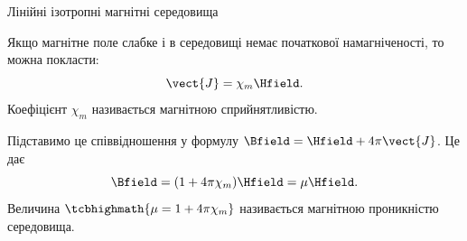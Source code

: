 \documentclass[onlytextwidth]{beamer}
\begin{document}
\begin{frame}{Лінійні ізотропні магнітні середовища}{}
	\begin{block}{}
		Якщо магнітне поле слабке і в середовищі немає початкової намагніченості, то можна покласти:
		\begin{equation*}
			\vect{J} = \chi_m\Hfield.
		\end{equation*}
		Коефіцієнт $ \chi_m$ називається \alert{магнітною сприйнятливістю}.

		Підставимо це співвідношення у формулу $\Bfield = \Hfield + 4\pi\vect{J}$. Це дає
		\begin{equation*}
			\Bfield = (1+4\pi\chi_m)\Hfield = \mu\Hfield.
		\end{equation*}
		Величина $\tcbhighmath{\mu = 1+4\pi\chi_m}$ називається \alert{магнітною проникністю середовища}.
	\end{block}
\end{frame}
\end{document}
